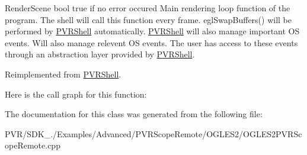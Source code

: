   Render\+Scene  bool true if no error occured  Main rendering loop function of the program. The shell will call this function every frame. egl\+Swap\+Buffers() will be performed by \hyperlink{class_p_v_r_shell}{P\+V\+R\+Shell} automatically. \hyperlink{class_p_v_r_shell}{P\+V\+R\+Shell} will also manage important O\+S events. Will also manage relevent O\+S events. The user has access to these events through an abstraction layer provided by \hyperlink{class_p_v_r_shell}{P\+V\+R\+Shell}. 

Reimplemented from \hyperlink{class_p_v_r_shell_ae0eb5f797cbe993a22b8659f9c332578}{P\+V\+R\+Shell}.



Here is the call graph for this function\+:




The documentation for this class was generated from the following file\+:\begin{DoxyCompactItemize}
\item 
P\+V\+R/\+S\+D\+K\+\_./\+Examples/\+Advanced/\+P\+V\+R\+Scope\+Remote/\+O\+G\+L\+E\+S2/O\+G\+L\+E\+S2\+P\+V\+R\+Scope\+Remote.\+cpp\end{DoxyCompactItemize}

